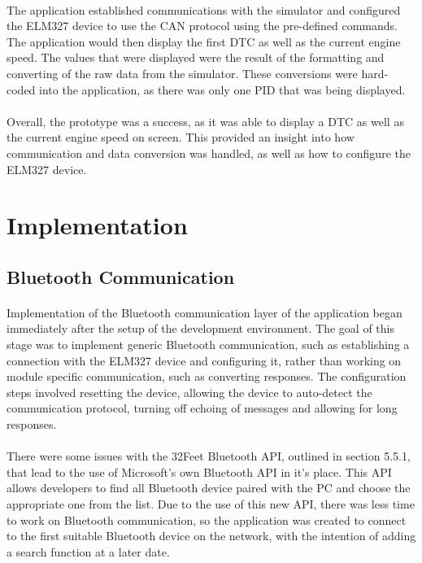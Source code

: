 	\paragraph{}{
	The application established communications with the simulator and configured the ELM327 device to use the CAN protocol using the pre-defined commands. The application would then display the first DTC as well as the current engine speed. The values that were displayed were the result of the formatting and converting of the raw data from the simulator. These conversions were hard-coded into the application, as there was only one PID that was being displayed.
	}
	\paragraph{}{	
	Overall, the prototype was a success, as it was able to display a DTC as well as the current engine speed on screen. This provided an insight into how communication and data conversion was handled, as well as how to configure the ELM327 device.
	}

\section{Implementation}
	\subsection{Bluetooth Communication}
		\paragraph{}{
		Implementation of the Bluetooth communication layer of the application began immediately after the setup of the development environment. The goal of this stage was to implement generic Bluetooth communication, such as establishing a connection with the ELM327 device and configuring it, rather than working on module specific communication, such as converting responses. The configuration steps involved resetting the device, allowing the device to auto-detect the communication protocol, turning off echoing of messages and allowing for long responses.
		}
		\paragraph{}{
		There were some issues with the 32Feet Bluetooth API, outlined in section 5.5.1, that lead to the use of Microsoft's own Bluetooth API in it's place. This API allows developers to find all Bluetooth device paired with the PC and choose the appropriate one from the list. Due to the use of this new API, there was less time to work on Bluetooth communication, so the application was created to connect to the first suitable Bluetooth device on the network, with the intention of adding a search function at a later date.
		}
		
